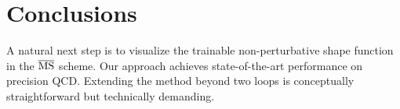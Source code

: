 \section{Conclusions}\label{sec:conclusions}

A natural next step is to visualize the trainable non-perturbative shape
function in the $\overline{\rm MS}$ scheme. Our approach achieves
state-of-the-art performance on precision QCD. Extending the method
beyond two loops is conceptually straightforward but technically
demanding.

